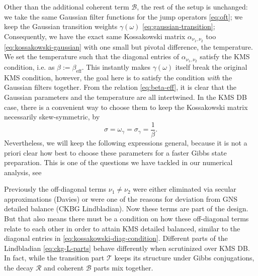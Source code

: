 Other than the additional coherent term $\mathcal{B}$, the rest of the setup is unchanged: we take the same Gaussian filter functions for the jump operators \eqref{eq:oft}; we keep the Gaussian transition weights $\gamma(\omega)$ \eqref{eq:gaussian-transition}; Consequently, we have the exact same Kossakowski matrix $\alpha_{\nu_1, \nu_2}$ too \eqref{eq:kossakowski-gaussian} with one small but pivotal difference, the temperature. We set the temperature such that the diagonal entries of $\alpha_{\nu_1,\nu_2}$ satisfy the KMS condition, i.e. as $\beta := \beta_\text{eff}$. This instantly makes $\gamma(\omega)$ itself break the original KMS condition, however, the goal here is to satisfy the condition \textit{with} the Gaussian filters together. From the relation \eqref{eq:beta-eff}, it is clear that the Gaussian parameters and the temperature are all intertwined. In the KMS DB case, there is a convenient way to choose them to keep the Kossakowski matrix necessarily skew-symmetric, by 
\begin{equation}
    \sigma = \omega_\gamma = \sigma_\gamma = \frac{1}{\beta}.
\end{equation}
Nevertheless, we will keep the following expressions general, because it is not a priori clear how best to choose these parameters for a faster Gibbs state preparation. This is one of the questions we have tackled in our numerical analysis, see 

Previously the off-diagonal terms $\nu_1 \neq \nu_2$ were either eliminated via secular approximations (Davies) or were one of the reasons for deviation from GNS detailed balance (CKBG Lindbladian). Now these terms are part of the design. But that also means there must be a condition on how these off-diagonal terms relate to each other in order to attain KMS detailed balanced, similar to the diagonal entries in \eqref{eq:kossakowski-diag-condition}.
Different parts of the Lindbladian \eqref{eq:ckg-L-parts} behave differently when scrutinized over KMS DB. In fact, while the transition part $\mathcal{T}$ keeps its structure under Gibbs conjugations, the decay $\mathcal{R}$ and coherent $\mathcal{B}$ parts mix together.

